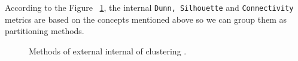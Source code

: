 According to the Figure ~\ref{fig:internal}, the internal \texttt{Dunn, Silhouette} and \texttt{Connectivity} metrics are based on the concepts mentioned above so we can group them as partitioning methods.

\begin{figure}[htbp]
  \centering
    \caption{Methods of external internal of clustering \citep{b54}.}%
    \label{fig:internal}%
\end{figure}

